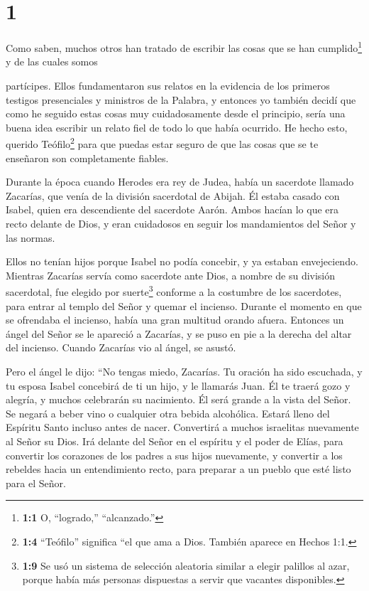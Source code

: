 \hypertarget{section}{%
\section{1}\label{section}}

 Como saben, muchos otros han tratado de escribir las cosas
que se han cumplido\footnote{\textbf{1:1} O, ``logrado,'' ``alcanzado.''}
y de las cuales somos

partícipes.  Ellos fundamentaron sus relatos en la evidencia
de los primeros testigos presenciales y ministros de la Palabra,
 y entonces yo también decidí que como he seguido estas
cosas muy cuidadosamente desde el principio, sería una buena idea
escribir un relato fiel de todo lo que había ocurrido.  He
hecho esto, querido Teófilo\footnote{\textbf{1:4} ``Teófilo'' significa
  ``el que ama a Dios. También aparece en Hechos 1:1.} para que puedas
estar seguro de que las cosas que se te enseñaron son completamente
fiables.

 Durante la época cuando Herodes era rey de Judea, había un
sacerdote llamado Zacarías, que venía de la división sacerdotal de
Abijah. Él estaba casado con Isabel, quien era descendiente del
sacerdote Aarón.  Ambos hacían lo que era recto delante de
Dios, y eran cuidadosos en seguir los mandamientos del Señor y las
normas.

 Ellos no tenían hijos porque Isabel no podía concebir, y ya
estaban envejeciendo.  Mientras Zacarías servía como
sacerdote ante Dios, a nombre de su división sacerdotal, 
fue elegido por suerte\footnote{\textbf{1:9} Se usó un sistema de
  selección aleatoria similar a elegir palillos al azar, porque había
  más personas dispuestas a servir que vacantes disponibles.} conforme a
la costumbre de los sacerdotes, para entrar al templo del Señor y quemar
el incienso.  Durante el momento en que se ofrendaba el
incienso, había una gran multitud orando afuera.  Entonces
un ángel del Señor se le apareció a Zacarías, y se puso en pie a la
derecha del altar del incienso.  Cuando Zacarías vio al
ángel, se asustó.

 Pero el ángel le dijo: ``No tengas miedo, Zacarías. Tu
oración ha sido escuchada, y tu esposa Isabel concebirá de ti un hijo, y
le llamarás Juan.  Él te traerá gozo y alegría, y muchos
celebrarán su nacimiento.  Él será grande a la vista del
Señor. Se negará a beber vino o cualquier otra bebida alcohólica. Estará
lleno del Espíritu Santo incluso antes de nacer. 
Convertirá a muchos israelitas nuevamente al Señor su Dios.
 Irá delante del Señor en el espíritu y el poder de Elías,
para convertir los corazones de los padres a sus hijos nuevamente, y
convertir a los rebeldes hacia un entendimiento recto, para preparar a
un pueblo que esté listo para el Señor.

